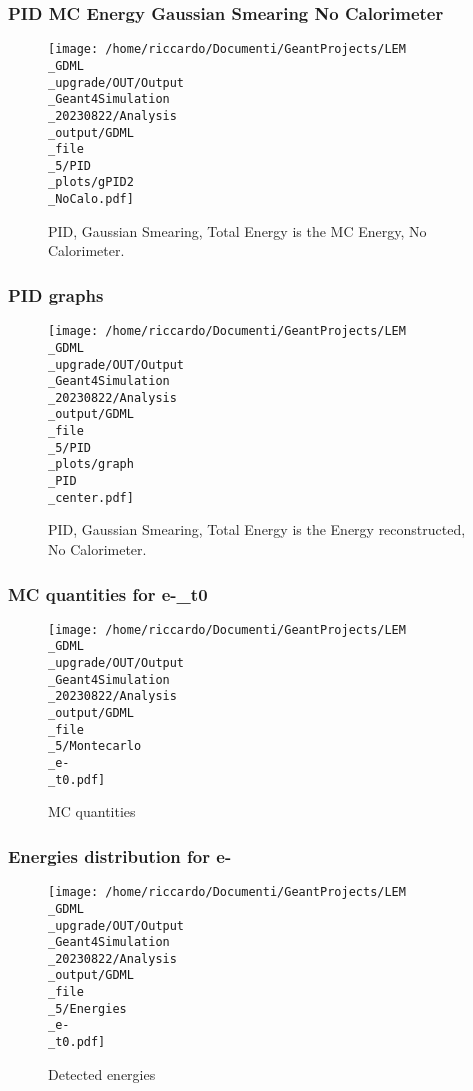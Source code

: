 \documentclass[8pt]{beamer}
\begin{document}
            \begin{frame}
                \frametitle{PID MC Energy Gaussian Smearing No Calorimeter}
            
        \begin{figure}[h]
            \centering
            \texttt{[image: /home/riccardo/Documenti/GeantProjects/LEM\\\_GDML\\\_upgrade/OUT/Output\\\_Geant4Simulation\\\_20230822/Analysis\\\_output/GDML\\\_file\\\_5/PID\\\_plots/gPID2\\\_NoCalo.pdf]}
            \caption{PID, Gaussian Smearing, Total Energy is the MC Energy, No Calorimeter.}
        \end{figure}
        
            \end{frame}
            
            \begin{frame}
                \frametitle{PID graphs}
            
        \begin{figure}[h]
            \centering
            \texttt{[image: /home/riccardo/Documenti/GeantProjects/LEM\\\_GDML\\\_upgrade/OUT/Output\\\_Geant4Simulation\\\_20230822/Analysis\\\_output/GDML\\\_file\\\_5/PID\\\_plots/graph\\\_PID\\\_center.pdf]}
            \caption{PID, Gaussian Smearing, Total Energy is the Energy reconstructed, No Calorimeter.}
        \end{figure}
        
            \end{frame}
            
            \begin{frame}
                \frametitle{MC quantities for e-\_t0}
            
        \begin{figure}[h]
            \centering
            \texttt{[image: /home/riccardo/Documenti/GeantProjects/LEM\\\_GDML\\\_upgrade/OUT/Output\\\_Geant4Simulation\\\_20230822/Analysis\\\_output/GDML\\\_file\\\_5/Montecarlo\\\_e-\\\_t0.pdf]}
            \caption{MC quantities}
        \end{figure}
        
            \end{frame}
            
            \begin{frame}
                \frametitle{Energies distribution for e-}
            
        \begin{figure}[h]
            \centering
            \texttt{[image: /home/riccardo/Documenti/GeantProjects/LEM\\\_GDML\\\_upgrade/OUT/Output\\\_Geant4Simulation\\\_20230822/Analysis\\\_output/GDML\\\_file\\\_5/Energies\\\_e-\\\_t0.pdf]}
            \caption{Detected energies}
        \end{figure}
        
            \end{frame}
            
\end{document}
